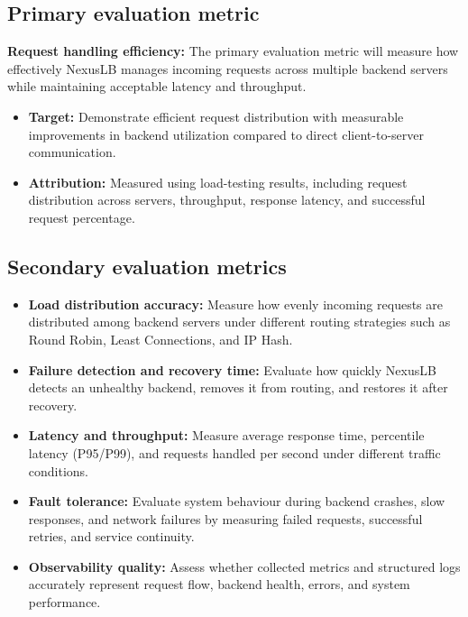 \documentclass[11pt,a4paper]{article}
\begin{document}
\subsection{Primary evaluation metric}

\textbf{Request handling efficiency:} The primary evaluation metric will measure how effectively NexusLB manages incoming requests across multiple backend servers while maintaining acceptable latency and throughput.

\begin{itemize}
    \item \textbf{Target:} Demonstrate efficient request distribution with measurable improvements in backend utilization compared to direct client-to-server communication.

    \item \textbf{Attribution:} Measured using load-testing results, including request distribution across servers, throughput, response latency, and successful request percentage.
\end{itemize}


\subsection{Secondary evaluation metrics}

\begin{itemize}
    \item \textbf{Load distribution accuracy:} Measure how evenly incoming requests are distributed among backend servers under different routing strategies such as Round Robin, Least Connections, and IP Hash.

    \item \textbf{Failure detection and recovery time:} Evaluate how quickly NexusLB detects an unhealthy backend, removes it from routing, and restores it after recovery.

    \item \textbf{Latency and throughput:} Measure average response time, percentile latency (P95/P99), and requests handled per second under different traffic conditions.

    \item \textbf{Fault tolerance:} Evaluate system behaviour during backend crashes, slow responses, and network failures by measuring failed requests, successful retries, and service continuity.

    \item \textbf{Observability quality:} Assess whether collected metrics and structured logs accurately represent request flow, backend health, errors, and system performance.
\end{itemize}
\end{document}
